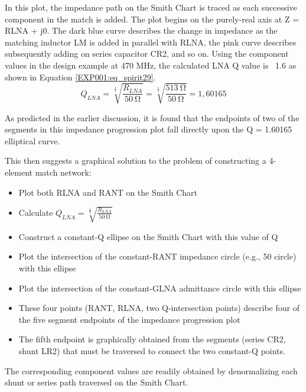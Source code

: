         In this plot, the impedance path on the Smith Chart is traced as each successive component 
        in the match is added. The plot begins on the purely-real axis at Z = RLNA + j0. The dark 
        blue curve describes the change in impedance as the matching inductor LM is added in 
        parallel with RLNA, the pink curve describes subsequently adding on series capacitor CR2, 
        and so on. Using the component values in the design example at 470 MHz, the calculated LNA 
        Q value is ~1.6 as shown in Equation 
        \ref{EXP001:eq_spirit29}.
        \begin{equation}\label{EXP001:eq_spirit29}
          Q_{LNA} = \sqrt[\frac{1}{2}]{\frac{R_{LNA}}{\SI{50}{\ohm}}}
                  = \sqrt[\frac{1}{2}]{\frac{\SI{513}{\ohm}}{\SI{50}{\ohm}}}
                  = 1,60165
        \end{equation}
        
        As predicted in the earlier discussion, it is found that the endpoints of two of the 
        segments in this impedance progression plot fall directly upon the Q = 1.60165 elliptical 
        curve.
        
        This then suggests a graphical solution to the problem of constructing a 4-element match network:
        \begin{itemize}[noitemsep]
          \item Plot both RLNA and RANT on the Smith Chart
          \item Calculate \(Q_{LNA} = \sqrt[\frac{1}{2}]{\frac{R_{LNA}}{\SI{50}{\ohm}}}\)
          \item Construct a constant-Q ellipse on the Smith Chart with this value of Q
          \item Plot the intersection of the constant-RANT impedance circle (e.g., 50 circle) with 
                this ellipse
          \item Plot the intersection of the constant-GLNA admittance circle with this ellipse
          \item These four points (RANT, RLNA, two Q-intersection points) describe four of the 
                five segment endpoints of the impedance progression plot
          \item The fifth endpoint is graphically obtained from the segments (series CR2, shunt  
                LR2) that must be traversed to connect the two constant-Q points.
        \end{itemize}
        The corresponding component values are readily obtained by denormalizing each shunt or series path 
        traversed on the Smith Chart.

